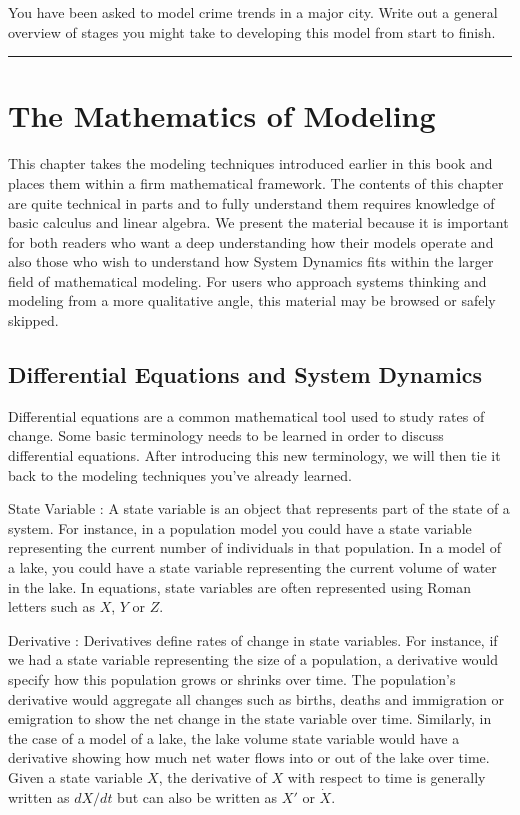 \documentclass[]{memoir}
\begin{document}
You have been asked to model crime trends in a major city. Write out a
general overview of stages you might take to developing this model from
start to finish.

\begin{center}\rule{3in}{0.4pt}\end{center}

\chapter{The Mathematics of Modeling}

This chapter takes the modeling techniques introduced earlier in this
book and places them within a firm mathematical framework. The contents
of this chapter are quite technical in parts and to fully understand
them requires knowledge of basic calculus and linear algebra. We present
the material because it is important for both readers who want a deep
understanding how their models operate and also those who wish to
understand how System Dynamics fits within the larger field of
mathematical modeling. For users who approach systems thinking and
modeling from a more qualitative angle, this material may be browsed or
safely skipped.

\section{Differential Equations and System Dynamics}

Differential equations are a common mathematical tool used to study
rates of change. Some basic terminology needs to be learned in order to
discuss differential equations. After introducing this new terminology,
we will then tie it back to the modeling techniques you've already
learned.

State Variable : A state variable is an object that represents part of
the state of a system. For instance, in a population model you could
have a state variable representing the current number of individuals in
that population. In a model of a lake, you could have a state variable
representing the current volume of water in the lake. In equations,
state variables are often represented using Roman letters such as $X$,
$Y$ or $Z$.

Derivative : Derivatives define rates of change in state variables. For
instance, if we had a state variable representing the size of a
population, a derivative would specify how this population grows or
shrinks over time. The population's derivative would aggregate all
changes such as births, deaths and immigration or emigration to show the
net change in the state variable over time. Similarly, in the case of a
model of a lake, the lake volume state variable would have a derivative
showing how much net water flows into or out of the lake over time.
Given a state variable $X$, the derivative of $X$ with respect to time
is generally written as $dX/dt$ but can also be written as $X'$ or
$\dot{X}$.
\end{document}

